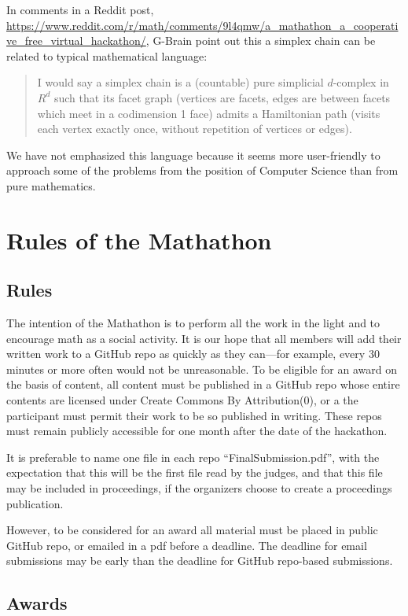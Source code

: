 \documentclass[11pt]{article}
\begin{document}
In comments in a Reddit post, \url{https://www.reddit.com/r/math/comments/9l4qmw/a_mathathon_a_cooperative_free_virtual_hackathon/},
G-Brain point out this a simplex chain can be related to typical mathematical language:
\begin{quote}
  I would say a simplex chain is a (countable) pure simplicial $d$-complex in $R^d$ such that its facet graph (vertices are facets, edges are between facets which meet in a codimension 1 face) admits a Hamiltonian path (visits each vertex exactly once, without repetition of vertices or edges).
\end{quote}
We have not emphasized this language because it seems more user-friendly to approach some of the problems from the position of Computer Science than from pure mathematics.

\section{Rules of the Mathathon}

\subsection{Rules}

The intention of the Mathathon is to perform all the work in the light and to encourage math
as a social activity.
It is our hope that all members will add their written work to a GitHub repo as quickly
as they can---for example, every 30 minutes or more often would not be unreasonable.
To be eligible for an award on the basis of content, all content must be published in a GitHub repo
whose entire contents are licensed under Create Commons By Attribution(0), or a the
participant must permit their work to be so published in writing.
These repos must remain publicly accessible for one month after the date of the hackathon.

It is preferable to name one file in each repo ``FinalSubmission.pdf'', with the expectation that this
will be the first file read by the judges, and that this file may be included in proceedings, if the
organizers choose to create a proceedings publication.

However, to be considered for an
award all material must be placed in public GitHub repo, or emailed in a pdf before a deadline.
The deadline for email submissions may be early than the deadline for GitHub repo-based submissions.

\subsection{Awards}
\end{document}
